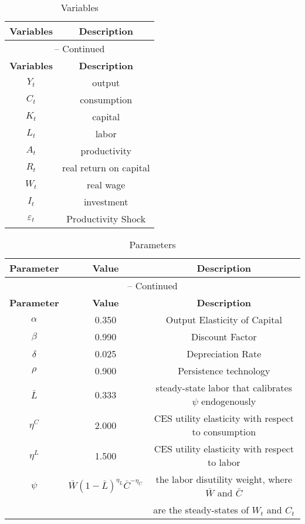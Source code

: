 \documentclass{article}
\begin{document}
\begin{center}
  \begin{longtable}{cc}
  \caption{Variables}\label{tbl:RBC.Variables}\\%
  \hline%
  \multicolumn{1}{c}{\textbf{Variables}} &
  \multicolumn{1}{c}{\textbf{Description}}\\%
  \hline\hline%
  \endfirsthead
  \multicolumn{2}{c}{{\tablename} \thetable{} -- Continued}\\%
  \hline%
  \multicolumn{1}{c}{\textbf{Variables}} &
  \multicolumn{1}{c}{\textbf{Description}}\\%
  \hline\hline%
  \endhead
  ${Y_t}$ & output\\
  ${C_t}$ & consumption\\
  ${K_t}$ & capital\\
  ${L_t}$ & labor\\
  ${A_t}$ & productivity\\
  ${R_t}$ & real return on capital\\
  ${W_t}$ & real wage\\
  ${I_t}$ & investment\\
  ${\varepsilon_t}$ & Productivity Shock\\
  \hline%
  \end{longtable}
\end{center}

\begin{center}
  \begin{longtable}{ccc}
  \caption{Parameters}\label{tbl:RBC.Parameters}\\%
  \toprule%
  \multicolumn{1}{c}{\textbf{Parameter}} &
  \multicolumn{1}{c}{\textbf{Value}} &
   \multicolumn{1}{c}{\textbf{Description}}\\%
  \midrule%
  \endfirsthead
  \multicolumn{3}{c}{{\tablename} \thetable{} -- Continued}\\%
  \midrule%
  \multicolumn{1}{c}{\textbf{Parameter}} &
  \multicolumn{1}{c}{\textbf{Value}} &
    \multicolumn{1}{c}{\textbf{Description}}\\%
  \midrule%
  \endhead
  ${\alpha}$ 	 & 	 0.350 	 & 	 Output Elasticity of Capital\\
  ${\beta}$ 	 & 	 0.990 	 & 	 Discount Factor\\
  ${\delta}$ 	 & 	 0.025 	 & 	 Depreciation Rate\\
  ${\rho}$ 	 & 	 0.900 	 & 	 Persistence technology\\
  ${\bar{L}}$ 	 & 	 0.333 	 & 	 steady-state labor that calibrates $\psi$ endogenously\\
  ${\eta^C}$ 	 & 	 2.000 	 & 	 CES utility elasticity with respect to consumption\\
  ${\eta^L}$ 	 & 	 1.500 	 & 	 CES utility elasticity with respect to labor\\
  ${\psi}$ 	   & 	 $\bar{W}(1-\bar{L})^{\eta_L} \bar{C}^{-\eta_C}$ 	 & 	the labor disutility weight, where $\bar{W}$ and $\bar{C}$ \\
               &           &are the steady-states of $W_t$ and $C_t$\\
  \bottomrule%
  \end{longtable}
\end{center}

  
\end{document}
